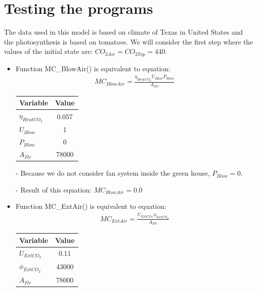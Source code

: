 \documentclass[a4paper]{article}
\begin{document}
\newpage
\section{Testing the programs}
The data used in this model is based on climate of Texas in United States and the photosynthesis is based on tomatoes. We will consider the first step where the values of the initial state are: \(CO_{2Air} = CO_{2Top} = 440\).
\begin{itemize}
  \item Function MC\_BlowAir() is equivalent to equation:
        \begin{align*}
          MC_{BlowAir} = \frac{\eta_{HeatCO_2}U_{Blow}P_{Blow}}{A_{Flr}}
        \end{align*}

        \begin{table}[H]
          \centering
          \begin{tabular}{@{}lS@{}}
            \toprule
            \textbf{Variable}   & \textbf{Value} \\
            \midrule
            \(\eta_{HeatCO_2}\) & 0.057          \\
            \(U_{Blow}\)        & 1              \\
            \(P_{Blow}\)        & 0              \\
            \(A_{Flr}\)         & 78000          \\
            \bottomrule
          \end{tabular}
        \end{table}

  \item[-] Because we do not consider fan system inside the green house, \(P_{Blow} = 0\).
  \item[-] Result of this equation: \(MC_{BlowAir} = 0.0\)

  \item Function MC\_ExtAir() is equivalent to equation:
        \begin{align*}
          MC_{ExtAir} = \frac{U_{ExtCO_2}\phi_{ExtCO_2}}{A_{Flr}}
        \end{align*}

        \begin{table}[H]
          \centering
          \begin{tabular}{@{}lS@{}}
            \toprule
            \textbf{Variable}  & \textbf{Value} \\
            \midrule
            \(U_{ExtCO_2}\)    & 0.11           \\
            \(\phi_{ExtCO_2}\) & 43000          \\
            \(A_{Flr}\)        & 78000          \\
            \bottomrule
          \end{tabular}
        \end{table}


\end{itemize}
\end{document}

